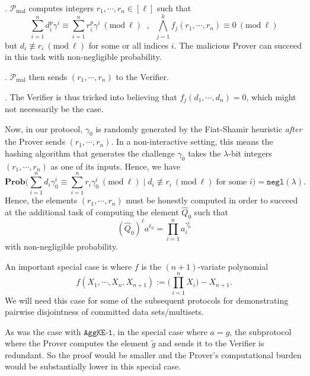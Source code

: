 \documentclass[11pt, lettersize, notitlepage, leqno, footskip=0.6cm]{article}
\newcommand{\pl}{\prod\limits}
\newcommand{\slim}{\sum\limits}
\newcommand{\ttt}{\texttt}
\newcommand{\negl}{\ttt{{negl}}}
\newcommand{\wti}{\widetilde}
\newcommand{\mc}{\mathcal}
\newcommand{\mb}{\mathbb}
\newcommand{\mbf}{\mathbf}
\newcommand{\mr}{\mathrm}
\newcommand{\lam}{\lambda}
\newcommand{\what}{\widehat}
\newcommand{\Prob}{\mbf{Prob}}
\newcommand{\mP}{\mc{P}}
\newcommand{\vs}{\vspace{-0.15cm}}
\newcommand{\noin}{\noindent}
\newcommand{\Mod}[1]{\ (\mathrm{mod}\ #1)}
\numberwithin{equation}{section}
\begin{document}
\noin 1. $\mP_{\mr{mal}}$ computes integers $r_1,\cdots,r_n\in[\ell]$ such that \vs $$ \slim_{i=1}^n d_i^{p}\gamma^i\equiv\slim_{i=1}^n r_i^{p}\gamma^i\Mod{\ell} \;\;,\;\; \bigwedge\limits_{j=1}^k f_j(r_1,\cdots,r_n) \equiv 0\Mod{\ell}$$ but $d_i\not\equiv r_i\Mod{\ell}$ for some or all indices $i$. The malicious Prover can succeed in this task with non-negligible probability.

\noin 2. $\mP_{\mr{mal}}$ then sends $(r_1,\cdots,r_n)$ to the Verifier.

\noin 3. The Verifier is thus tricked into believing that $f_j(d_1,\cdots,d_n) = 0$, which might not necessarily be the case.

Now, in our protocol, $\gamma_0$ is randomly generated by the Fiat-Shamir heuristic \textit{after} the Prover sends $(r_1,\cdots,r_n)$. In a non-interactive setting, this means the hashing algorithm that generates the challenge $\gamma_0$ takes the $\lam$-bit integers $(r_1,\cdots,r_n)$ as one of its inputs. Hence, we have \vs $$\Prob\Big(\slim_{i=1}^n d_i\gamma_0^i \equiv \slim_{i=1}^n r_i\gamma_0^i \Mod{\ell}\;\Big|\; d_i\not\equiv r_i\Mod{\ell}\;\text{for some } i\Big) = \negl(\lam). $$ Hence, the elements $(r_1,\cdots,r_n)$ must be honestly computed in order to succeed at the additional task of computing the element $\what{Q}_0$ such that \vs $$(\what{Q}_0)^{\ell}a^{\what{r}_0} = \pl_{i=1}^{n} a_i^{\gamma_0^i} $$ with non-negligible probability.

\begin{comment} Although the proof is linear in size because of the $\lam$-bit integers $r_1,\cdots,r_n$, the number of $\mb{G}$-elements in this proof is constant. Since the group elements are much larger than $\lam$-bits, the communication complexity is substantially smaller that sending over $n$ separate arguments of knowledge. For instance, when $\lam = 128$, the group elements are of bit-size $3072$ with a RSA group, $6656$-bits with an imaginary quadratic class group and $3300$-bits with a Jacobian of a genus three hyperelliptic curve.\end{comment}

An important special case is where $f$ is the $(n+1)$-variate polynomial \vs $$f(X_1,\cdots,X_n, X_{n+1}) := \big(\pl_{i=1}^n X_i \big)- X_{n+1}.$$ We will need this case for some of the subsequent protocols for demonstrating pairwise disjointness of committed data sets/multisets.

As was the case with $\ttt{AggKE-1}$, in the special case where $a = g$, the subprotocol where the Prover computes the element $\wti{g}$ and sends it to the Verifier is redundant. So the proof would be smaller and the Prover's computational burden would be substantially lower in this special case.
\end{document}
